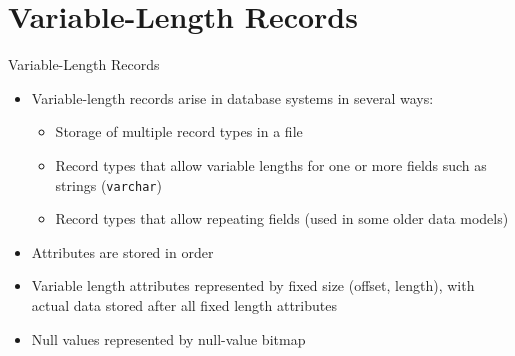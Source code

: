 \documentclass[aspectratio=169, xcolor=dvipsnames]{beamer}
\begin{document}
\section{Variable-Length Records}

\begin{frame}{Variable-Length Records}
    \begin{block}{}
        \begin{itemize}[<+->]
            \item Variable-length records arise in database systems in several ways:
            \begin{itemize}[<+->]
                \item Storage of multiple record types in a file
                \item Record types that allow variable lengths for one or more fields such as strings (\texttt{varchar})
                \item Record types that allow repeating fields (used in some older data models)
            \end{itemize}
            \item Attributes are stored in order
            \item Variable length attributes represented by fixed size (offset, length), with actual data stored after all fixed length attributes
            \item Null values represented by null-value bitmap
        \end{itemize}
    \end{block}
\end{frame}
\end{document}
